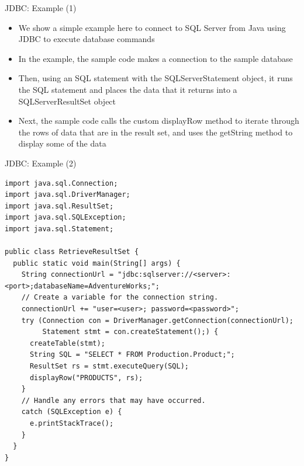 \documentclass[aspectratio=169, xcolor=dvipsnames]{beamer}
\begin{document}
\begin{frame}{JDBC: Example (1)}
    \begin{itemize}[<+->]
        \item We show a simple example here to connect to SQL Server from Java using JDBC to execute database commands
        \item In the example, the sample code makes a connection to the sample database
        \item Then, using an SQL statement with the SQLServerStatement object, it runs the SQL statement and places the data that it returns into a SQLServerResultSet object
        \item Next, the sample code calls the custom displayRow method to iterate through the rows of data that are in the result set, and uses the getString method to display some of the data
    \end{itemize}
\end{frame}

\begin{frame}[fragile]{JDBC: Example (2)}
    \begin{verbatim}
import java.sql.Connection;
import java.sql.DriverManager;
import java.sql.ResultSet;
import java.sql.SQLException;
import java.sql.Statement;

public class RetrieveResultSet {
  public static void main(String[] args) {
    String connectionUrl = "jdbc:sqlserver://<server>:<port>;databaseName=AdventureWorks;";
    // Create a variable for the connection string.
    connectionUrl += "user=<user>; password=<password>";
    try (Connection con = DriverManager.getConnection(connectionUrl);
         Statement stmt = con.createStatement();) {
      createTable(stmt);
      String SQL = "SELECT * FROM Production.Product;";
      ResultSet rs = stmt.executeQuery(SQL);
      displayRow("PRODUCTS", rs);
    }
    // Handle any errors that may have occurred.
    catch (SQLException e) {
      e.printStackTrace();
    }
  }
}
    \end{verbatim}
\end{frame}
\end{document}
